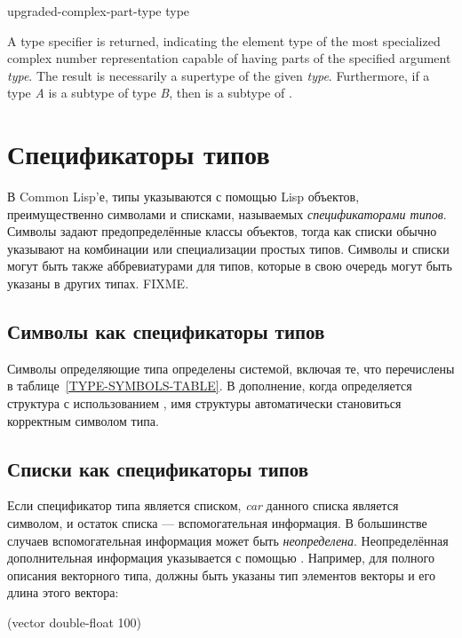 \begin{new}
\begin{defun}[Function]
upgraded-complex-part-type type

A type specifier is returned, indicating the element type
of the most specialized complex number representation capable of having
parts of the specified argument \emph{type}.
The result is necessarily a supertype of the given \emph{type}.
Furthermore, if a type \emph{A} is a subtype of type \emph{B}, then
 is a subtype of
.
\end{defun}

\end{new}

\else


\chapter{Спецификаторы типов}    %
\label{DTSPEC}

В Common Lisp'е, типы указываются с помощью Lisp объектов, преимущественно
символами и списками, называемых \emph{спецификаторами типов}. Символы задают
предопределённые классы объектов, тогда как списки обычно указывают на
комбинации или специализации простых типов.
Символы и списки могут быть также аббревиатурами для типов, которые в свою
очередь могут быть указаны в других типах. FIXME. 

\section{Символы как спецификаторы типов}

Символы определяющие типа определены системой, включая те, что перечислены в
таблице~\ref{TYPE-SYMBOLS-TABLE}.
В дополнение, когда определяется структура с использованием , имя
структуры автоматически становиться корректным символом типа.

\section{Списки как спецификаторы типов}

Если спецификатор типа является списком, \emph{car} данного списка является
символом, и остаток списка --- вспомогательная информация. В большинстве случаев
вспомогательная информация может быть \emph{неопределена}. Неопределённая
дополнительная информация указывается с помощью \cdf{*}. Например, для полного
описания векторного типа, должны быть указаны тип элементов векторы и его длина
этого вектора:
\begin{lisp}
(vector double-float 100)
\end{lisp}

